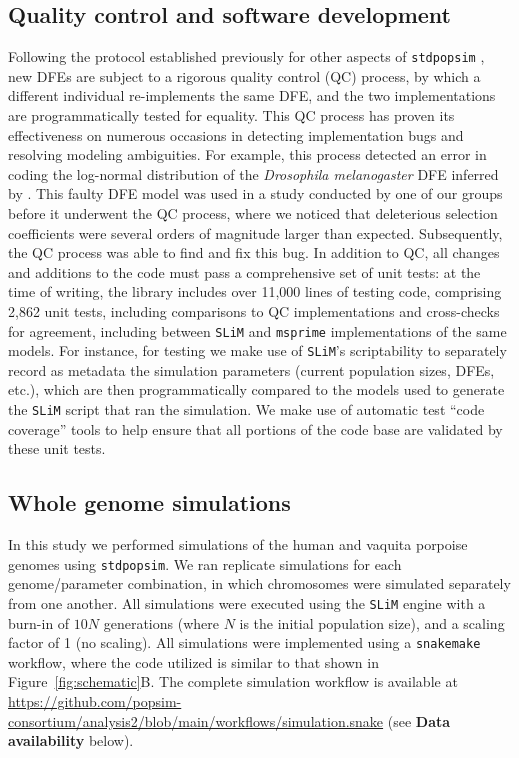 \documentclass[hidelinks]{article}
\newcommand{\stdpopsim}{\texttt{stdpopsim}\xspace}
\newcommand{\slim}{\texttt{SLiM}\xspace}
\newcommand{\msprime}{\texttt{msprime}\xspace}
\newcommand{\snakemake}{\texttt{snakemake}\xspace}
\begin{document}
    \subsection*{Quality control and software development}
    Following the protocol established previously for other aspects of \stdpopsim{} \citep{adrion2020community},
    new DFEs are subject to a rigorous quality control (QC) process,
    by which a different individual re-implements the same DFE, and the two implementations
    are programmatically tested for equality.
    This QC process has proven its effectiveness on numerous occasions in detecting implementation bugs
    and resolving modeling ambiguities.
    For example, this process detected  an error in coding the log-normal distribution of
    the \textit{Drosophila melanogaster} DFE inferred by \citet[\stdpopsim label \texttt{LognormalPlusPositive\_R16}]{booker2021selective}.
    This faulty DFE model was used in a study conducted by one of our groups before it underwent the QC process,
    where we noticed that deleterious selection coefficients
    were several orders of magnitude larger than expected.
    Subsequently, the QC process was able to find and fix this bug.
    In addition to QC, all changes and additions to the code must pass a comprehensive set of unit tests:
    at the time of writing, the library includes over 11,000 lines of testing code,
    comprising 2,862 unit tests, including comparisons to QC implementations
    and cross-checks for agreement, including between \slim and \msprime implementations of the same models.
    For instance, for testing we make use of \slim's scriptability to separately record as metadata
    the simulation parameters (current population sizes, DFEs, etc.),
    which are then programmatically compared to the models used to generate the \slim script
    that ran the simulation.
    We make use of automatic test ``code coverage'' tools to help ensure that all portions of the code base
    are validated by these unit tests.

    \subsection*{Whole genome simulations}
    In this study we performed simulations of the human and vaquita porpoise genomes
    using \stdpopsim{}. We ran replicate simulations for each genome/parameter combination,
    in which chromosomes were simulated separately from one another.
    All simulations were executed using the \slim engine with a burn-in of $10N$ generations
    (where $N$ is the initial population size), and a scaling factor of 1 (no scaling).
    All simulations were implemented using a \snakemake workflow,
    where the code utilized is similar to that shown in Figure~\ref{fig:schematic}B.
    The complete simulation workflow is available at \url{https://github.com/popsim-consortium/analysis2/blob/main/workflows/simulation.snake}
    (see \textbf{Data availability} below).
\end{document}
